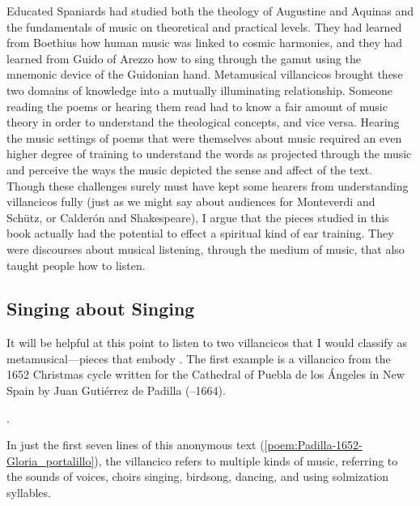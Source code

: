 Educated Spaniards had studied both the theology of Augustine and Aquinas and  
the fundamentals of music on theoretical and practical levels. 
They had learned from Boethius how human music was linked to cosmic harmonies,
and they had learned from Guido of Arezzo how to sing through the gamut using
the mnemonic device of the Guidonian hand.
Metamusical villancicos brought these two domains of knowledge into a mutually
illuminating relationship.
Someone reading the poems or hearing them read had to know a fair amount of
music theory in order to understand the theological concepts, and vice versa.
Hearing the music settings of poems that were themselves about music required
an even higher degree of training to understand the words as projected through
the music and perceive the ways the music depicted the sense and affect of the
text.
Though these challenges surely must have kept some hearers from understanding
villancicos fully (just as we might say about audiences for Monteverdi and
Schütz, or Calderón and Shakespeare), I argue that the pieces studied in this
book actually had the potential to effect a spiritual kind of ear training. 
They were discourses about musical listening, through the medium of music, that
also taught people how to listen.

\subsection{Singing about Singing}

It will be helpful at this point to listen to two villancicos that I would
classify as metamusical---pieces that embody .%
    \autocites{Murata:Singing}
    [\XXX]{Illari:Polychoral}
The first example is a villancico from the 1652 Christmas cycle written for the
Cathedral of Puebla de los Ángeles in New Spain by Juan Gutiérrez de Padilla
(--1664).%
\begin{Footnote}
    . 
\end{Footnote}
In just the first seven lines of this anonymous text
(\cref{poem:Padilla-1652-Gloria_portalillo}), the villancico refers to multiple
kinds of music, referring to the sounds of voices, choirs singing, birdsong,
dancing, and using solmization syllables.


